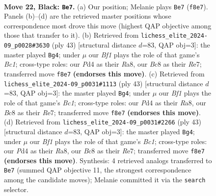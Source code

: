 \documentclass[11pt]{article}
\begin{document}
\clearpage

\begin{figure}[p]\centering
\begin{subfigure}{0.46\textwidth}\centering
\resizebox{\linewidth}{!}{%
\newchessgame
\chessboard[
  setfen={1rb1kb1r/2q3pp/1p6/p2QR1B1/3p3P/8/PP3PP1/RN4K1 b - - 0 22},
  showmover=false,
  pgfstyle=straightmove, color=movearrow, markmove={f8-e7}
]}
\caption{}
\end{subfigure}\hfill
\begin{subfigure}{0.46\textwidth}\centering
\resizebox{\linewidth}{!}{%
\newchessgame
\chessboard[
  setfen={r1b2q1k/4r2p/1p5p/p1bQ3N/8/5N2/PP3PPP/2R2R1K b - - 0 22},
  showmover=false,
  pgfstyle=straightmove, color=movearrow, markmove={c8-g4}
]}
\caption{}
\end{subfigure}
\\[4pt]
\begin{subfigure}{0.46\textwidth}\centering
\resizebox{\linewidth}{!}{%
\newchessgame
\chessboard[
  setfen={r1b2q1k/4r2p/1p5p/p1bQ3N/8/5N2/PP3PPP/2R2R1K b - - 0 22},
  showmover=false,
  pgfstyle=straightmove, color=movearrow, markmove={c8-g4}
]}
\caption{}
\end{subfigure}\hfill
\begin{subfigure}{0.46\textwidth}\centering
\resizebox{\linewidth}{!}{%
\newchessgame
\chessboard[
  setfen={r1b2q1k/4r2p/1p5p/p1bQ3N/8/5N2/PP3PPP/2R2R1K b - - 0 22},
  showmover=false,
  pgfstyle=straightmove, color=movearrow, markmove={c8-g4}
]}
\caption{}
\end{subfigure}
\caption{\textbf{Move 22, Black: \texttt{Be7}.} (a) Our position; Melanie plays \texttt{Be7} (\texttt{f8e7}). Panels (b)--(d) are the retrieved master positions whose correspondence most drove this move (highest QAP objective among those that transfer to it). (b) Retrieved from \texttt{lichess\_elite\_2024-09\_p0028\#3630} (ply 43) [structural distance $d$=83, QAP obj=3]: the master played \texttt{Bg4}; under $\mu$ our \emph{Bf1} plays the role of that game's \emph{Bc1}; cross-type roles: our \emph{P}d4 as their \emph{R}a8, our \emph{B}c8 as their \emph{R}e7; transferred move \texttt{f8e7} \textbf{(endorses this move)}. (c) Retrieved from \texttt{lichess\_elite\_2024-09\_p0031\#1113} (ply 43) [structural distance $d$=83, QAP obj=3]: the master played \texttt{Bg4}; under $\mu$ our \emph{Bf1} plays the role of that game's \emph{Bc1}; cross-type roles: our \emph{P}d4 as their \emph{R}a8, our \emph{B}c8 as their \emph{R}e7; transferred move \texttt{f8e7} \textbf{(endorses this move)}. (d) Retrieved from \texttt{lichess\_elite\_2024-09\_p0031\#2266} (ply 43) [structural distance $d$=83, QAP obj=3]: the master played \texttt{Bg4}; under $\mu$ our \emph{Bf1} plays the role of that game's \emph{Bc1}; cross-type roles: our \emph{P}d4 as their \emph{R}a8, our \emph{B}c8 as their \emph{R}e7; transferred move \texttt{f8e7} \textbf{(endorses this move)}. Synthesis: 4 retrieved analogs transferred to \texttt{Be7} (summed QAP objective 11, the strongest correspondence among the candidate moves); Melanie committed it via the \texttt{search} selector.}
\label{fig:thought-m43}
\end{figure}
\end{document}
